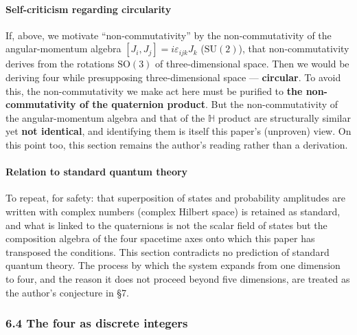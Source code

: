 \documentclass[
]{article}
\begin{document}
\paragraph{Self-criticism regarding
circularity}\label{self-criticism-regarding-circularity}

If, above, we motivate ``non-commutativity'' by the non-commutativity of
the angular-momentum algebra \([J_i,J_j]=i\varepsilon_{ijk}J_k\)
(\(\mathrm{SU}(2)\)), that non-commutativity derives from the rotations
\(\mathrm{SO}(3)\) of three-dimensional space. Then we would be deriving
four while presupposing three-dimensional space --- \textbf{circular}.
To avoid this, the non-commutativity we make act here must be purified
to \textbf{the non-commutativity of the quaternion product}. But the
non-commutativity of the angular-momentum algebra and that of the
\(\mathbb{H}\) product are structurally similar yet \textbf{not
identical}, and identifying them is itself this paper's (unproven) view.
On this point too, this section remains the author's reading rather than
a derivation.

\paragraph{Relation to standard quantum
theory}\label{relation-to-standard-quantum-theory}

To repeat, for safety: that superposition of states and probability
amplitudes are written with complex numbers (complex Hilbert space) is
retained as standard, and what is linked to the quaternions is not the
scalar field of states but the composition algebra of the four spacetime
axes onto which this paper has transposed the conditions. This section
contradicts no prediction of standard quantum theory. The process by
which the system expands from one dimension to four, and the reason it
does not proceed beyond five dimensions, are treated as the author's
conjecture in §7.

\subsubsection{6.4 The four as discrete
integers}\label{the-four-as-discrete-integers}
\end{document}

